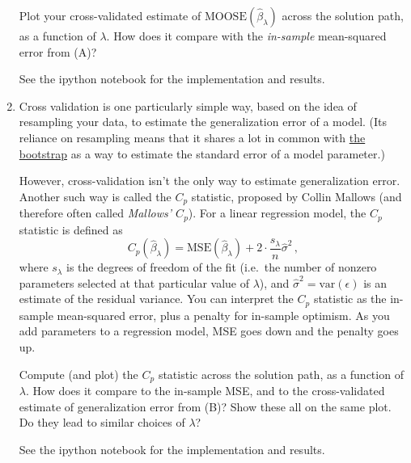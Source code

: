 \documentclass{article}
\begin{document}
\begin{enumerate}[label=(\Alph*)]
Plot your cross-validated estimate of $\mathrm{MOOSE}(\hat{\beta}_{\lambda})$ across the solution path, as a function of $\lambda$.  How does it compare with the \textit{in-sample} mean-squared error from (A)?


{\color{blue}
See the ipython notebook for the implementation and results.
}

\item Cross validation is one particularly simple way, based on the idea of resampling your data, to estimate the generalization error of a model.  (Its reliance on resampling means that it shares a lot in common with \href{https://en.wikipedia.org/wiki/Bootstrapping_(statistics)}{the bootstrap} as a way to estimate the standard error of a model parameter.)

However, cross-validation isn't the only way to estimate generalization error.  Another such way is called the $C_p$ statistic, proposed by Collin Mallows (and therefore often called \textit{Mallows' $C_p$}).  For a linear regression model, the $C_p$ statistic is defined as
$$
C_p(\hat{\beta}_\lambda) = \mathrm{MSE}(\hat \beta_{\lambda}) + 2 \cdot \frac{s_{\lambda}}{n} \hat \sigma^2 \, ,
$$
where $s_{\lambda}$ is the degrees of freedom of the fit (i.e.~the number of nonzero parameters selected at that particular value of $\lambda$), and $\hat \sigma^2 = \mathrm{var}(\epsilon)$ is an estimate of the residual variance.  You can interpret the $C_p$ statistic as the in-sample mean-squared error, plus a penalty for in-sample optimism.  As you add parameters to a regression model, MSE goes down and the penalty goes up. 

Compute (and plot) the $C_p$ statistic across the solution path, as a function of $\lambda$.  How does it compare to the in-sample MSE, and to the cross-validated estimate of generalization error from (B)?  Show these all on the same plot.  Do they lead to similar choices of $\lambda$?


{\color{blue}
See the ipython notebook for the implementation and results.
}


\end{enumerate}
\end{document}
